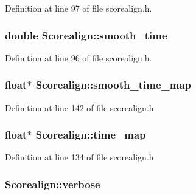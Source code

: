 Definition at line 97 of file scorealign.\+h.

\subsubsection[{\texorpdfstring{smooth\+\_\+time}{smooth_time}}]{\setlength{\rightskip}{0pt plus 5cm}double Scorealign\+::smooth\+\_\+time}\hypertarget{class_scorealign_ab2421e375fa06931019107530ef0362d}{}\label{class_scorealign_ab2421e375fa06931019107530ef0362d}


Definition at line 96 of file scorealign.\+h.

\subsubsection[{\texorpdfstring{smooth\+\_\+time\+\_\+map}{smooth_time_map}}]{\setlength{\rightskip}{0pt plus 5cm}float$\ast$ Scorealign\+::smooth\+\_\+time\+\_\+map}\hypertarget{class_scorealign_ab207618c47378f693d84b72f36ac0eb8}{}\label{class_scorealign_ab207618c47378f693d84b72f36ac0eb8}


Definition at line 142 of file scorealign.\+h.

\subsubsection[{\texorpdfstring{time\+\_\+map}{time_map}}]{\setlength{\rightskip}{0pt plus 5cm}float$\ast$ Scorealign\+::time\+\_\+map}\hypertarget{class_scorealign_a9970a288920ebf2706f309a53b3ee362}{}\label{class_scorealign_a9970a288920ebf2706f309a53b3ee362}


Definition at line 134 of file scorealign.\+h.

\subsubsection[{\texorpdfstring{verbose}{verbose}}]{ Scorealign\+::verbose}\hypertarget{class_scorealign_af1e35fb2a5a516e2cb77c19b7344b8ff}{}\label{class_scorealign_af1e35fb2a5a516e2cb77c19b7344b8ff}


